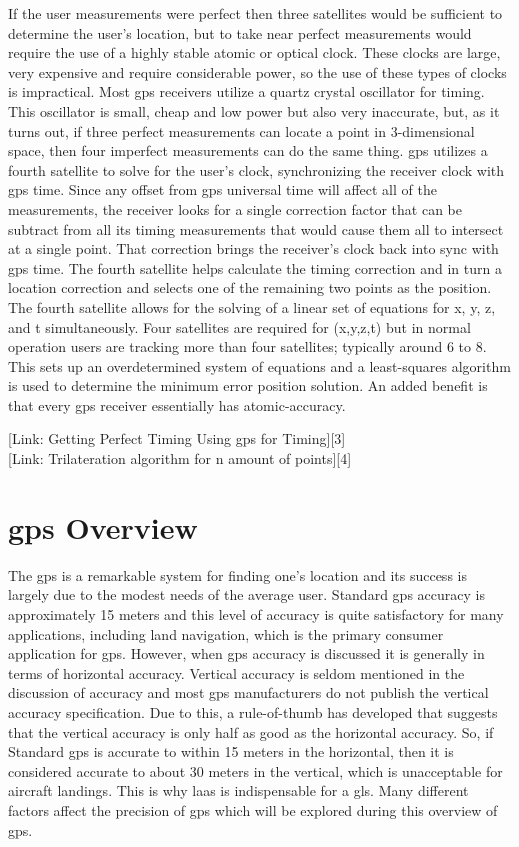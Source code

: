 If the user measurements were perfect then three satellites would be
sufficient to determine the user's location, but to take near perfect
measurements would require the use of a highly stable atomic or optical
clock. These clocks are large, very expensive and require considerable
power, so the use of these types of clocks is impractical. Most \ac{gps}
receivers utilize a quartz crystal oscillator for timing. This
oscillator is small, cheap and low power but also very inaccurate, but,
as it turns out, if three perfect measurements can locate a point in
3-dimensional space, then four imperfect measurements can do the same
thing. \ac{gps} utilizes a fourth satellite to solve for the user's clock,
synchronizing the receiver clock with \ac{gps} time. Since any offset from
\ac{gps} universal time will affect all of the measurements, the receiver
looks for a single correction factor that can be subtract from all its
timing measurements that would cause them all to intersect at a single
point. That correction brings the receiver's clock back into sync with
\ac{gps} time. The fourth satellite helps calculate the timing correction and
in turn a location correction and selects one of the remaining two
points as the position. The fourth satellite allows for the solving of a
linear set of equations for x, y, z, and t simultaneously. Four
satellites are required for (x,y,z,t) but in normal operation users are
tracking more than four satellites; typically around 6 to 8. This sets
up an overdetermined system of equations and a least-squares algorithm
is used to determine the minimum error position solution. An added
benefit is that every \ac{gps} receiver essentially has atomic-accuracy.

{[}Link: Getting Perfect Timing Using \ac{gps} for Timing{]}{[}3{]}\\
{[}Link: Trilateration algorithm for n amount of points{]}{[}4{]}

\section{\ac{gps} Overview}

The \ac{gps} is a remarkable system for finding one's location and its success is largely due to the modest needs of the average user. Standard \ac{gps} accuracy is approximately 15 meters\citep[]{GPS_FOR_DUMMIES} and this level of accuracy is quite satisfactory for many applications, including land navigation, which is the primary consumer application for \ac{gps}. However, when \ac{gps} accuracy is discussed it is generally in terms of horizontal accuracy.  Vertical accuracy is seldom mentioned in the discussion of accuracy and most \ac{gps} manufacturers do not publish the vertical accuracy specification.  Due to this, a rule-of-thumb has developed that suggests that the vertical accuracy is only half as good as the horizontal accuracy.  So, if Standard \ac{gps} is accurate to within 15 meters in the horizontal, then it is considered accurate to about 30 meters in the vertical, which is unacceptable for aircraft landings. This is why \ac{laas} is indispensable for a \ac{gls}.  Many different factors affect the precision of \ac{gps} which will be explored during this overview of \ac{gps}.

